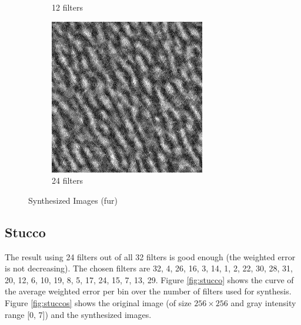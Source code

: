 \documentclass[11pt, oneside]{article}   	%
\begin{document}
\begin{figure}[H]
\begin{subfigure}[b]{0.3\textwidth}
        \caption{12 filters}
        \label{fig:fur12}
    \end{subfigure}
    \begin{subfigure}[b]{0.3\textwidth}
        \includegraphics[width=\textwidth]{fur24}
        \caption{24 filters}
        \label{fig:fur24}
    \end{subfigure}
    \caption{Synthesized Images (fur)}\label{fig:furs}
\end{figure}

\subsection{Stucco}
The result using 24 filters out of all 32 filters is good enough (the weighted error is not decreasing). The chosen filters are 32, 4, 26, 16, 3, 14, 1, 2, 22, 30, 28, 31, 20, 12, 6, 10, 19, 8, 5, 17, 24, 15, 7, 13, 29. Figure \ref{fig:stucco} shows the curve of the average weighted error per bin over the number of filters used for synthesis. Figure \ref{fig:stuccos} shows the original image (of size $256 \times 256$ and gray intensity range [0, 7]) and the synthesized images.
\end{document}
